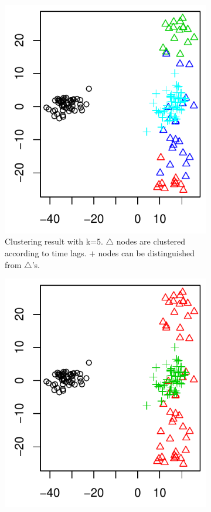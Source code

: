\begin{figure}[H]
\begin{minipage}{0.49\textwidth}
\begin{subfigure}{\textwidth}
\includegraphics[width=\textwidth]{../simulation/plots/case2_overclus_res}
\caption{Clustering result with k=5. $\triangle$ nodes are clustered according to time lags. $+$ nodes can be distinguished from $\triangle$'s.}
\end{subfigure}
\begin{subfigure}{\textwidth}
\includegraphics[width=\textwidth]{../simulation/plots/case2_overclusNmerge_res}

\end{subfigure}
\end{minipage}
\end{figure}
